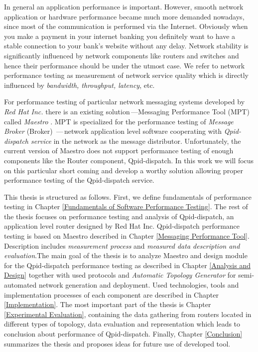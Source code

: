In general an application performance is important. However, smooth network application or hardware performance became much more demanded nowadays, since most of the communication is performed via the Internet.  Obviously when you make a payment in your internet banking you definitely want to have a stable connection to your bank's website without any delay. Network stability is significantly influenced by network components like routers and switches and hence their performance should be under the utmost case. We refer to network performance testing as measurement of network service quality which is directly influenced by \emph{bandwidth, throughput, latency}, etc.

For performance testing of particular network messaging systems developed by \emph{Red Hat Inc.} there is an existing solution\,---Messaging Performance Tool (MPT) called \emph{Maestro} \cite{ORPISKE:MSGPT}. MPT is specialized for the performance testing of \emph{Message Broker} (Broker) \cite{RH:Broker}\,---\,network application level software cooperating with \emph{Qpid-dispatch service} \cite{RH:Interconnect} in the network as the message distributor. Unfortunately, the current version of Maestro does not support performance testing of enough components like the Router component, Qpid-dispatch. In this work we will focus on this particular short coming and develop a worthy solution allowing proper performance testing of the Qpid-dispatch service.

This thesis is structured as follows. First, we define fundamentals of performance testing in Chapter \ref{Fundamentals of Software Performance Testing}. The rest of the thesis focuses on performance testing and analysis of Qpid-dispatch, an application level router designed by Red Hat Inc. Qpid-dispatch performance testing is based on Maestro described in Chapter \ref{Messaging Performance Tool}. Description includes \emph{measurement process} and \emph{measured data description and evaluation}.The main goal of the thesis is to analyze Maestro and design module for the Qpid-dispatch performance testing as described in Chapter \ref{Analysis and Design} together with used protocols and \emph{Automatic Topology Generator} for semi-automated network generation and deployment. Used technologies, tools and  implementation processes of each component are described in Chapter \ref{Implementation}. The most important part of the thesis is Chapter \ref{Experimental Evaluation}, containing the data gathering  from routers located in different types of topology, data evaluation and representation which leads to conclusion about performance of Qpid-dispatch. Finally, Chapter \ref{Conclusion} summarizes the thesis and proposes ideas for future use of developed tool.


